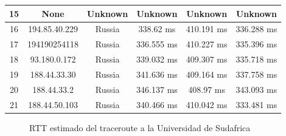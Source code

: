 \begin{table}[]
\begin{tabular}{ | c | c | c | c | c | c | }
15	&None           &     	      Unknown    &   	      Unknown     &  	      Unknown     &  	      Unknown   \\ \hline    
16	&194.85.40.229  &     	       Russia    &   	      338.62 ms   &  	     410.191 ms   &  	     336.288 ms \\ \hline    
17	&194190254118	  &     Russia       	    & 336.555 ms     	     &410.227 ms     	     &335.396 ms     \\ \hline
18	&93.180.0.172   &     	       Russia    &   	     339.032 ms   &  	     409.307 ms   &  	     335.718 ms \\ \hline    
19	&188.44.33.30   &     	       Russia    &   	     341.636 ms   &  	     409.164 ms   &  	     337.758 ms \\ \hline    
20	&188.44.33.2    &     	       Russia    &   	     346.137 ms   &  	      408.97 ms   &  	     343.093 ms \\ \hline    
21	&188.44.50.103  &     	       Russia    &   	     340.466 ms   &  	     410.042 ms   &  	     333.481 ms \\ \hline     

\end{tabular}
\end{table}


\begin{figure}[H]
  \centering
  \caption{RTT estimado del traceroute a la Universidad de Sudafrica}
  \label{africaTTL}
  
\end{figure}

